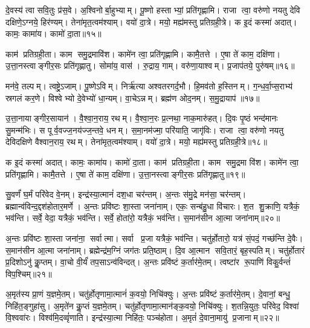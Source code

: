 दे॒वस्य॑ त्वा सवि॒तुः प्र॑स॒वे। अ॒श्विनोर्बा॒हुभ्याम्। पू॒ष्णो हस्ताभ्यां॒ प्रति॑गृह्णामि। राजा त्वा॒ वरु॑णो नयतु देवि दक्षिणे॒ऽग्नये॒ हिर॑ण्यम्। तेना॑मृत॒त्वम॑श्याम्। वयो॑ दा॒त्रे। मयो॒ मह्य॑मस्तु प्रतिग्रही॒त्रे। क इ॒दं कस्मा॑ अदात्। कामः॒ कामा॑य। कामो॑ दा॒ता॥१५॥

काम॑ प्रतिग्रही॒ता। काम समु॒द्रमावि॑श। कामे॑न त्वा॒ प्रति॑गृह्णामि। कामै॒तत्ते। ए॒षा ते॑ काम॒ दक्षि॑णा। उ॒त्ता॒नस्त्वाङ्गीर॒सः प्रति॑गृह्णातु। सोमा॑य॒ वास॑। रु॒द्राय॒ गाम्। वरु॑णा॒याश्वम्। प्र॒जाप॑तये॒ पुरु॑षम्॥१६॥%

मन॑वे॒ तल्पम्। त्वष्ट्रे॒ऽजाम्। पू॒ष्णेऽविम्। निर्\mbox{}ऋ॑त्या अश्वतरगर्द॒भौ। हि॒मव॑तो ह॒स्तिनम्। ग॒न्ध॒र्वा॒प्स॒राभ्य॑ स्रगलं कर॒णे। विश्वेभ्यो दे॒वेभ्यो॑ धा॒न्यम्। वा॒चेऽन्नम्। ब्रह्म॑ण ओद॒नम्। स॒मु॒द्रायाप॑॥१७॥

उ॒त्ता॒नायाङ्गीर॒सायान॑। वै॒श्वा॒न॒राय॒ रथम्। वै॒श्वा॒न॒रः प्र॒त्नथा॒ नाक॒मारु॑हत्। दि॒वः पृ॒ष्ठं भन्द॑मानः सु॒मन्म॑भिः। स पूर्व॒वज्ज॒नय॑ज्ज॒न्तवे॒ धनम्। स॒मा॒नम॑ज्मा॒ परि॑याति॒ जागृ॑विः। राजा त्वा॒ वरु॑णो नयतु देविदक्षिणे वैश्वान॒राय॒ रथम्। तेना॑मृत॒त्वम॑श्याम्। वयो॑ दा॒त्रे। मयो॒ मह्य॑मस्तु प्रतिग्रही॒त्रे॥१८॥

क इ॒दं कस्मा॑ अदात्। कामः॒ कामा॑य। कामो॑ दा॒ता। काम॑ प्रतिग्रही॒ता। काम समु॒द्रमा वि॑श। कामे॑न त्वा॒ प्रति॑गृह्णामि। कामै॒तत्ते। ए॒षा ते॑ काम॒ दक्षि॑णा। उ॒त्ता॒नस्त्वाङ्गीर॒सः प्रति॑गृह्णातु॥१९॥
\anuvakamend[दा॒ता पुरु॑ष॒मप॑ प्रतिग्रही॒त्रे नव॑ च]

सु॒वर्णं॑ घ॒र्मं परि॑वेद वे॒नम्। इन्द्र॑स्या॒त्मानं॑ दश॒धा चर॑न्तम्। अ॒न्तः स॑मु॒द्रे मन॑सा॒ चर॑न्तम्। ब्रह्मान्व॑विन्द॒द्दश॑होतार॒मर्णे। अ॒न्तः प्रवि॑ष्टः  शा॒स्ता जना॑नाम्। एकः॒ सन्ब॑हु॒धा वि॑चारः। श॒त शु॒क्राणि॒ यत्रैकं॒ भव॑न्ति। सर्वे॒ वेदा॒ यत्रैकं॒ भव॑न्ति। सर्वे॒ होता॑रो॒ यत्रैकं॒ भव॑न्ति। स॒मान॑सीन आ॒त्मा जना॑नाम्॥२०॥%

अ॒न्तः प्रवि॑ष्टः  शा॒स्ता जना॑ना॒ सर्वात्मा। सर्वा प्र॒जा यत्रैकं॒ भव॑न्ति। चतु॑र्\mbox{}होतारो॒ यत्र॑ सं॒पदं॒ गच्छ॑न्ति दे॒वैः। स॒मान॑सीन आ॒त्मा जना॑नाम्। ब्रह्मेन्द्र॑म॒ग्निं जग॑तः प्रति॒ष्ठाम्। दि॒व आ॒त्मान सवि॒तारं॒ बृह॒स्पतिम्। चतु॑र्\mbox{}होतारं प्र॒दिशोऽनु॑ कॢ॒प्तम्। वा॒चो वी॒र्यं॑ तप॒साऽन्व॑विन्दत्। अ॒न्तः प्रवि॑ष्टं क॒र्तार॑मे॒तम्। त्वष्टा॑र रू॒पाणि॑ विकु॒र्वन्तं॑ विप॒श्चिम्॥२१॥

अ॒मृत॑स्य प्रा॒णं य॒ज्ञमे॒तम्। चतु॑र्\mbox{}होतृणामा॒त्मानं॑ क॒वयो॒ निचि॑क्युः। अ॒न्तः प्रवि॑ष्टं क॒र्तार॑मे॒तम्। दे॒वानां॒ बन्धु॒ निहि॑त॒ङ्गुहा॑सु। अ॒मृते॑न कॢ॒प्तं य॒ज्ञमे॒तम्। चतु॑र्\mbox{}होतृणामा॒त्मान॑ङ्क॒वयो॒ निचि॑क्युः। श॒तन्नि॒युतः॒ परि॑वेद॒ विश्वा॑ वि॒श्ववा॑रः। विश्व॑मि॒दव्वृं॑णाति। इन्द्र॑स्या॒त्मा निहि॑तः॒ पञ्च॑होता। अ॒मृतं॑ दे॒वाना॒मायु॑ प्र॒जानाम्॥२२॥%

